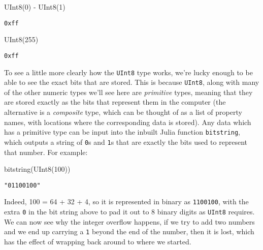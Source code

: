 \documentclass[
  letterpaper,
  DIV=11,
  numbers=noendperiod]{scrreprt}
\newenvironment{Shaded}{\begin{snugshade}}{\end{snugshade}}
\newcommand{\FloatTok}[1]{\textcolor[rgb]{0.68,0.00,0.00}{#1}}
\newcommand{\FunctionTok}[1]{\textcolor[rgb]{0.28,0.35,0.67}{#1}}
\newcommand{\NormalTok}[1]{\textcolor[rgb]{0.00,0.23,0.31}{#1}}
\newcommand{\OperatorTok}[1]{\textcolor[rgb]{0.37,0.37,0.37}{#1}}
\begin{document}
\begin{Shaded}
\begin{Highlighting}[]
\FunctionTok{UInt8}\NormalTok{(}\FloatTok{0}\NormalTok{) }\OperatorTok{{-}} \FunctionTok{UInt8}\NormalTok{(}\FloatTok{1}\NormalTok{)}
\end{Highlighting}
\end{Shaded}

\begin{verbatim}
0xff
\end{verbatim}

\begin{Shaded}
\begin{Highlighting}[]
\FunctionTok{UInt8}\NormalTok{(}\FloatTok{255}\NormalTok{)}
\end{Highlighting}
\end{Shaded}

\begin{verbatim}
0xff
\end{verbatim}

To see a little more clearly how the \texttt{UInt8} type works, we're
lucky enough to be able to see the exact bits that are stored. This is
because \texttt{UInt8}, along with many of the other numeric types we'll
see here are \emph{primitive} types, meaning that they are stored
exactly as the bits that represent them in the computer (the alternative
is a \emph{composite} type, which can be thought of as a list of
property names, with locations where the corresponding data is stored).
Any data which has a primitive type can be input into the inbuilt Julia
function \texttt{bitstring}, which outputs a string of \texttt{0}s and
\texttt{1}s that are exactly the bits used to represent that number. For
example:

\begin{Shaded}
\begin{Highlighting}[]
\FunctionTok{bitstring}\NormalTok{(}\FunctionTok{UInt8}\NormalTok{(}\FloatTok{100}\NormalTok{))}
\end{Highlighting}
\end{Shaded}

\begin{verbatim}
"01100100"
\end{verbatim}

Indeed, 100 = 64 + 32 + 4, so it is represented in binary as
\texttt{1100100}, with the extra \texttt{0} in the bit string above to
pad it out to 8 binary digits as \texttt{UInt8} requires. We can now see
why the integer overflow happens, if we try to add two numbers and we
end up carrying a \texttt{1} beyond the end of the number, then it is
lost, which has the effect of wrapping back around to where we started.
\end{document}
